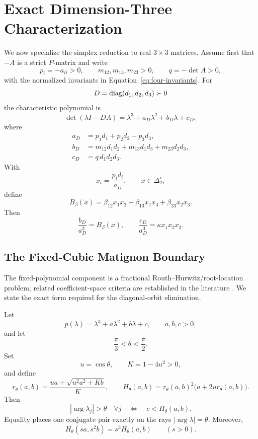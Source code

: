 \section{Exact Dimension-Three Characterization}\label{sec:three}

We now specialize the simplex reduction to real \(3\times3\) matrices. Assume first that \(-A\) is a strict \(P\)-matrix and write
\[
p_i=-a_{ii}>0,\qquad
m_{12},m_{13},m_{23}>0,\qquad
q=-\det A>0,
\]
with the normalized invariants in Equation~\eqref{eq:four-invariants}. For
\[
D=\operatorname{diag}(d_1,d_2,d_3)\succ0
\]
the characteristic polynomial is
\begin{equation}
\det(\lambda I-DA)
=
\lambda^3+a_D\lambda^2+b_D\lambda+c_D,
\label{eq:cubicD}
\end{equation}
where
\begin{align}
a_D&=p_1d_1+p_2d_2+p_3d_3,\\
b_D&=m_{12}d_1d_2+m_{13}d_1d_3+m_{23}d_2d_3,\\
c_D&=q\,d_1d_2d_3.
\end{align}
With
\[
x_i=\frac{p_id_i}{a_D},
\qquad x\in\Delta_2^\circ,
\]
define
\begin{equation}
B_\beta(x)
=
\beta_{12}x_1x_2+
\beta_{13}x_1x_3+
\beta_{23}x_2x_3.
\label{eq:Bbeta}
\end{equation}
Then
\begin{equation}
\frac{b_D}{a_D^2}=B_\beta(x),
\qquad
\frac{c_D}{a_D^3}=\kappa x_1x_2x_3.
\label{eq:normalized-coeffs}
\end{equation}

\subsection{The Fixed-Cubic Matignon Boundary}

The fixed-polynomial component is a fractional Routh--Hurwitz/root-location problem; related coefficient-space criteria are established in the literature \cite{CermakNechvatal2017,BourafaAbdelouahabMoussaoui2020}. We state the exact form required for the diagonal-orbit elimination.

\begin{Lemma}\label{lem:cubic-boundary}
Let
\[
p(\lambda)=\lambda^3+a\lambda^2+b\lambda+c,
\qquad a,b,c>0,
\]
and let
\[
\frac{\pi}{3}<\theta<\frac{\pi}{2}.
\]
Set
\[
u=\cos\theta,\qquad K=1-4u^2>0,
\]
and define
\begin{equation}
r_\theta(a,b)
=
\frac{ua+\sqrt{u^2a^2+Kb}}{K},
\qquad
H_\theta(a,b)
=
r_\theta(a,b)^2\bigl(a+2ur_\theta(a,b)\bigr).
\label{eq:Htheta}
\end{equation}
Then
\begin{equation}
|\arg\lambda_j|>\theta\quad\forall j
\quad\Longleftrightarrow\quad
c<H_\theta(a,b).
\label{eq:fixed-cubic-iff}
\end{equation}
Equality places one conjugate pair exactly on the rays \(|\arg\lambda|=\theta\). Moreover,
\[
H_\theta(sa,s^2b)=s^3H_\theta(a,b)
\qquad(s>0).
\]
\end{Lemma}

